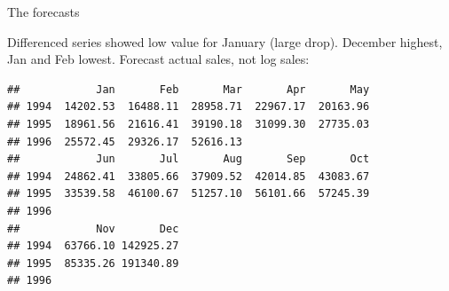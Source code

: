 \begin{frame}[fragile]{The forecasts}

Differenced series showed low value for January (large drop). December
highest, Jan and Feb lowest. Forecast actual sales, not log sales:

{\footnotesize
\begin{knitrout}
\color{fgcolor}\begin{kframe}
\begin{alltt}
\hlopt{$}
\end{alltt}
\begin{verbatim}
##            Jan       Feb       Mar       Apr       May
## 1994  14202.53  16488.11  28958.71  22967.17  20163.96
## 1995  18961.56  21616.41  39190.18  31099.30  27735.03
## 1996  25572.45  29326.17  52616.13                    
##            Jun       Jul       Aug       Sep       Oct
## 1994  24862.41  33805.66  37909.52  42014.85  43083.67
## 1995  33539.58  46100.67  51257.10  56101.66  57245.39
## 1996                                                  
##            Nov       Dec
## 1994  63766.10 142925.27
## 1995  85335.26 191340.89
## 1996
\end{verbatim}
\end{kframe}
\end{knitrout}
}
  
\end{frame}

